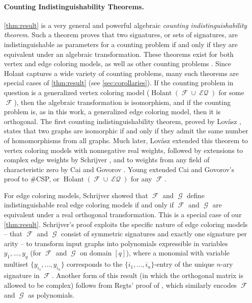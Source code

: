 \documentclass{theoretics}
\DeclareMathOperator{\fc}{\mathcal{F}}
\DeclareMathOperator{\gc}{\mathcal{G}}
\DeclareMathOperator{\holant}{Holant}
\DeclareMathOperator{\eq}{\mathcal{EQ}}
\begin{document}
\paragraph{Counting Indistinguishability Theorems.}
\autoref{thm:result} is a very general and powerful algebraic 
\emph{counting indistinguishability theorem}. 
Such a theorem proves that two signatures, or sets of signatures, are indistinguishable
as parameters for a counting problem if and only if they are equivalent under an algebraic
transformation. These theorems exist for both vertex and edge coloring models, as well as other
counting problems \cite{dvorak_recognizing_2010, sherali-adams, dell, grohe_homomorphism_2022, lasserre}.
Since Holant captures a wide variety of counting problems,
many such theorems are special cases
of \autoref{thm:result} (see \autoref{sec:corollaries}).
If the counting problem in question is a generalized vertex coloring model ($\holant(\fc \cup \eq)$
for some $\fc$), then the algebraic transformation is isomorphism, and if the counting problem is,
as in this work, a generalized edge coloring model, then it is orthogonal.
The first counting indistinguishability theorem, proved by Lov\'{a}sz \cite{lovasz_operations}, 
states that two graphs are
isomorphic if and only if they admit the same number of homomorphisms from all graphs. Much later,
Lov\'{a}sz \cite{lovasz} extended this theorem to vertex coloring models with nonnegative real 
weights, followed by extensions to complex edge weights by Schrijver 
\cite{schrijver}, and to weights from any field of characteristic zero by Cai and Govorov 
\cite{cai-lovasz}. Young \cite{young2022equality} extended Cai and Govorov's proof to \#CSP, or
$\holant(\fc \cup \eq)$ for any $\fc$. 

For edge coloring models, Schrijver \cite{schrijver_graph_2008} showed that 
$\fc$ and $\gc$ define indistinguishable real edge coloring models if and only if
$\fc$ and $\gc$ are equivalent under a real orthogonal transformation. 
This is a special case of our \autoref{thm:result}.
Schrijver's proof exploits the specific nature of edge coloring models -- that $\fc$ and $\gc$ consist
of symmetric signatures and exactly one signature per arity -- to transform input graphs into polynomials
expressible in variables $y_1,\ldots,y_q$ (for $\fc$ and $\gc$ on domain $[q]$), 
where a monomial with variable multiset $\{y_{i_1},\ldots, y_{i_n}\}$ corresponds to the
$\{i_1,\ldots,i_n\}$-entry of the unique $n$-ary signature in $\fc$.
Another form of this result (in which the orthogonal matrix is allowed to be complex) 
follows from Regts' proof of 
\cite[Lemma 5]{regts_characterization_2013}, which similarly encodes $\fc$ and $\gc$ as polynomials.
\end{document}
